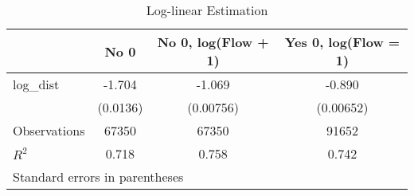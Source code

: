 \begin{table}[htbp]\centering
\caption{Log-linear Estimation}
\begin{tabular}{l*{3}{c}}
\hline\hline
                    &\multicolumn{1}{c}{No 0}&\multicolumn{1}{c}{No 0, log(Flow + 1)}&\multicolumn{1}{c}{Yes 0, log(Flow = 1)}\\
\hline
log\_dist            &      -1.704&      -1.069&      -0.890\\
                    &    (0.0136)&   (0.00756)&   (0.00652)\\
\hline
Observations        &       67350&       67350&       91652\\
\(R^{2}\)           &       0.718&       0.758&       0.742\\
\hline\hline
\multicolumn{4}{l}{\footnotesize Standard errors in parentheses}\\
\end{tabular}
\end{table}
